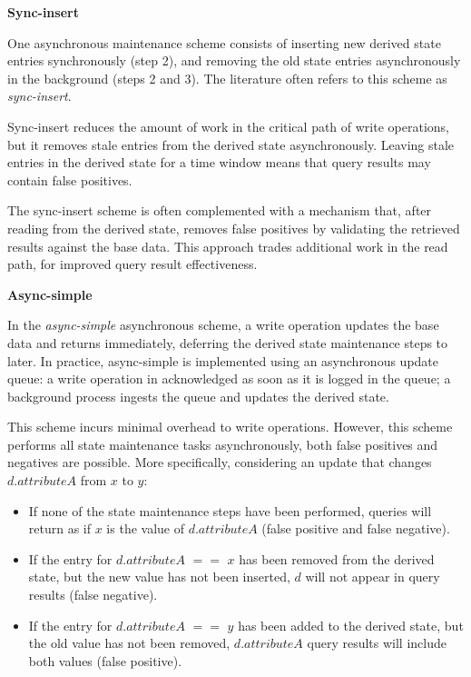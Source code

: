 


\bigskip
\noindent
\textbf{Sync-insert}

\noindent
One asynchronous maintenance scheme consists of inserting new derived state entries synchronously (step 2),
and removing the old state entries asynchronously in the background (steps 2 and 3).
The literature often refers to this scheme as \textit{sync-insert}.

Sync-insert reduces the amount of work in the critical path of write operations,
but it removes stale entries from the derived state asynchronously.
Leaving stale entries in the derived state for a time window means that query results may contain false positives.

The sync-insert scheme is often complemented with a mechanism that,
after reading from the derived state, removes false positives by validating the retrieved results against
the base data.
This approach trades additional work in the read path, for improved query result effectiveness.

\bigskip
\noindent
\textbf{Async-simple}

\noindent
In the \textit{async-simple} asynchronous scheme,
a write operation updates the base data and returns immediately,
deferring the derived state maintenance steps to later.
In practice, async-simple is implemented using an asynchronous update queue:
a write operation in acknowledged as soon as it is logged in the queue;
a background process ingests the queue and updates the derived state.

This scheme incurs minimal overhead to write operations.
However, this scheme performs all state maintenance tasks asynchronously,
both false positives and negatives are possible.
More specifically, considering an update that changes $d.attributeA$ from $x$ to $y$:
\begin{itemize}
  \item If none of the state maintenance steps have been performed, queries will return as if $x$ is the value of $d.attributeA$
  (false positive and false negative).

  \item If the entry for $d.attributeA$ $==$ $x$ has been removed from the derived state, but the new value has not been
  inserted, $d$ will not appear in query results (false negative).

  \item If the entry for $d.attributeA$ $==$ $y$ has been added to the derived state, but the old value has not been
  removed, $d.attributeA$ query results will include both values (false positive).
\end{itemize}

